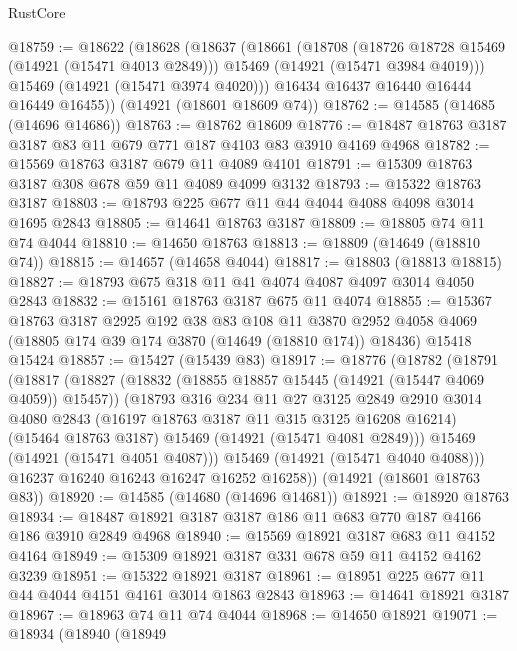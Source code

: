 \begin{lexlean}{RustCore}
\begin{coremodule}
@18759 := @18622
    (@18628
      (@18637
        (@18661
          (@18708
            (@18726 @18728 @15469 (@14921 (@15471 @4013 @2849)))
            @15469
            (@14921 (@15471 @3984 @4019)))
          @15469
          (@14921 (@15471 @3974 @4020)))
        @16434
        @16437
        @16440
        @16444
        @16449
        @16455))
    (@14921 (@18601 @18609 @74))
@18762 := @14585 (@14685 (@14696 @14686))
@18763 := @18762 @18609
@18776 := @18487 @18763 @3187 @3187 @83 @11 @679 @771 @187 @4103 @83 @3910 @4169 @4968
@18782 := @15569 @18763 @3187 @679 @11 @4089 @4101
@18791 := @15309 @18763 @3187 @308 @678 @59 @11 @4089 @4099 @3132
@18793 := @15322 @18763 @3187
@18803 := @18793 @225 @677 @11 @44 @4044 @4088 @4098 @3014 @1695 @2843
@18805 := @14641 @18763 @3187
@18809 := @18805 @74 @11 @74 @4044
@18810 := @14650 @18763
@18813 := @18809 (@14649 (@18810 @74))
@18815 := @14657 (@14658 @4044)
@18817 := @18803 (@18813 @18815)
@18827 := @18793 @675 @318 @11 @41 @4074 @4087 @4097 @3014 @4050 @2843
@18832 := @15161 @18763 @3187 @675 @11 @4074
@18855 := @15367
    @18763
    @3187
    @2925
    @192
    @38
    @83
    @108
    @11
    @3870
    @2952
    @4058
    @4069
    (@18805 @174 @39 @174 @3870 (@14649 (@18810 @174)) @18436)
    @15418
    @15424
@18857 := @15427 (@15439 @83)
@18917 := @18776
    (@18782
      (@18791
        (@18817
          (@18827
            (@18832 (@18855 @18857 @15445 (@14921 (@15447 @4069 @4059)) @15457))
            (@18793
              @316
              @234
              @11
              @27
              @3125
              @2849
              @2910
              @3014
              @4080
              @2843
              (@16197 @18763 @3187 @11 @315 @3125 @16208 @16214)
              (@15464 @18763 @3187)
              @15469
              (@14921 (@15471 @4081 @2849)))
            @15469
            (@14921 (@15471 @4051 @4087)))
          @15469
          (@14921 (@15471 @4040 @4088)))
        @16237
        @16240
        @16243
        @16247
        @16252
        @16258))
    (@14921 (@18601 @18763 @83))
@18920 := @14585 (@14680 (@14696 @14681))
@18921 := @18920 @18763
@18934 := @18487 @18921 @3187 @3187 @186 @11 @683 @770 @187 @4166 @186 @3910 @2849 @4968
@18940 := @15569 @18921 @3187 @683 @11 @4152 @4164
@18949 := @15309 @18921 @3187 @331 @678 @59 @11 @4152 @4162 @3239
@18951 := @15322 @18921 @3187
@18961 := @18951 @225 @677 @11 @44 @4044 @4151 @4161 @3014 @1863 @2843
@18963 := @14641 @18921 @3187
@18967 := @18963 @74 @11 @74 @4044
@18968 := @14650 @18921
@19071 := @18934
    (@18940
      (@18949

\end{coremodule}
\end{lexlean}
